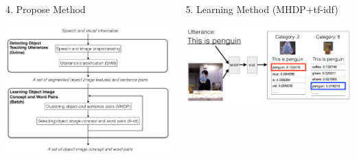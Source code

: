 \documentclass[final,hyperref={pdfpagelabels=false}]{beamer}
\newcommand{\shrink}{-15pt}
\begin{document}
\begin{frame}[t]
\begin{columns}[t]
\begin{column}{.43\textwidth}
    \begin{block}{4. Propose Method}
      \begin{center}
        \includegraphics[width=0.9\columnwidth]{./fig/propose_method.pdf}
      \end{center}
    \end{block}

  \end{column} %



  \begin{column}{.43\textwidth} %
    \vspace{\shrink}

    \begin{block}{5. Learning Method (MHDP+tf-idf)}
      \begin{center}
        \includegraphics[width=0.9\columnwidth]{./fig/learning_method.pdf}
      \end{center}
    \end{block}


\end{column}
\end{columns}
\end{frame}
\end{document}
